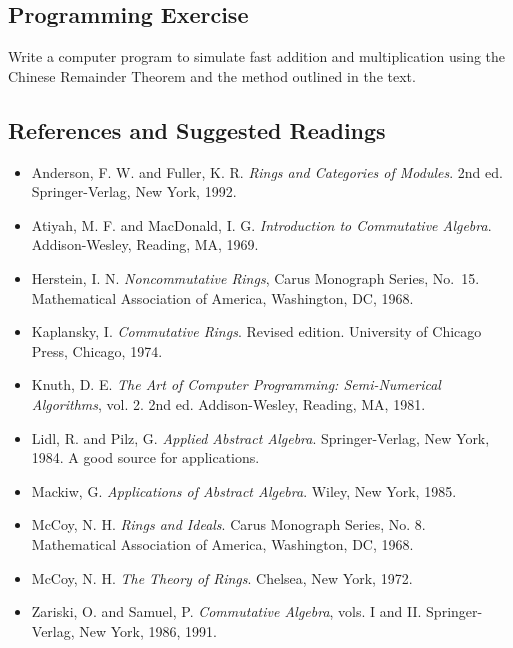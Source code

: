  
 
\subsection*{Programming Exercise}
 
 
Write a computer program to simulate fast addition and multiplication
using the Chinese Remainder Theorem and the method outlined in the
text. 
 
 
 
\subsection*{References and Suggested Readings}
 
{\small
\begin{itemize}
 
\item[{\bf [1]}]
Anderson, F. W. and Fuller, K. R. {\it Rings and Categories of
Modules}. 2nd ed.  Springer-Verlag, New York, 1992.
 
\item[{\bf [2]}]
Atiyah, M. F.  and MacDonald, I. G. {\it Introduction to
Commutative Algebra}. Addison-Wesley, Reading, MA, 1969.
 
\item[{\bf [3]}]
Herstein, I. N. {\it Noncommutative Rings}, Carus Monograph
Series, No.~15. Mathematical Association of America,
Washington, DC, 1968.
 
 
\item[{\bf [4]}]
Kaplansky, I. {\it Commutative Rings}. Revised edition.
University of Chicago Press, Chicago, 1974.
 
 
\item[{\bf [5]}]
Knuth, D. E. {\it The Art of Computer Programming: Semi-Numerical
Algorithms}, vol. 2. 2nd ed. Addison-Wesley, Reading, MA, 1981. 
 
 
\item[{\bf [6]}]
Lidl, R. and Pilz, G. {\it Applied Abstract Algebra}.
Springer-Verlag, New York, 1984. A good source for applications.
 
\item[{\bf [7]}]
Mackiw, G. {\it Applications of Abstract Algebra}. Wiley,
New York, 1985.
 
 
\item[{\bf [8]}]
McCoy,  N. H. {\it  Rings and Ideals}. Carus Monograph Series, No. 8.
Mathematical Association of America, Washington, DC, 1968. 
 
\item[{\bf [9]}]
McCoy,  N. H. {\it  The Theory of Rings}. Chelsea, New York, 1972.
 
\item[{\bf [10]}]
Zariski, O. and Samuel, P. {\it Commutative Algebra}, vols. I
and II. Springer-Verlag, New York, 1986, 1991.
 
 
 
\end{itemize}
}
 
 
 
 
